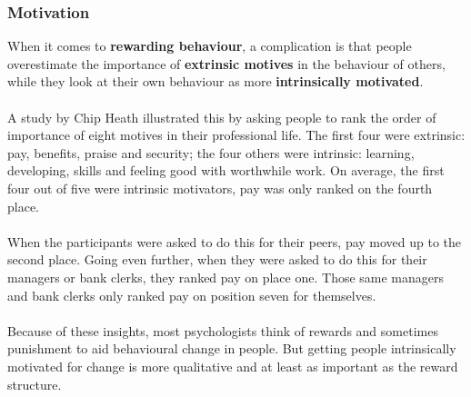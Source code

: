 \documentclass[../summary.tex]{subfiles}
\begin{document}
			\subsubsection{Motivation}
			When it comes to \textbf{rewarding behaviour}, a complication is that people overestimate the importance of \textbf{extrinsic motives} in the behaviour of others, while they look at their own behaviour as more \textbf{intrinsically motivated}.
			\\\\
			A study by Chip Heath illustrated this by asking people to rank the order of importance of eight motives in their professional life. The first four were extrinsic: pay, benefits, praise and security; the four others were intrinsic: learning, developing, skills and feeling good with worthwhile work. On average, the first four out of five were intrinsic motivators, pay was only ranked on the fourth place. 
			\\\\
			When the participants were asked to do this for their peers, pay moved up to the second place. Going even further, when they were asked to do this for their managers or bank clerks, they ranked pay on place one. Those same managers and bank clerks only ranked pay on position seven for themselves. 
			\\\\
			Because of these insights, most psychologists think of rewards and sometimes punishment to aid behavioural change in people. But getting people intrinsically motivated for change is more qualitative and at least as important as the reward structure. 
		\newpage
\end{document}
